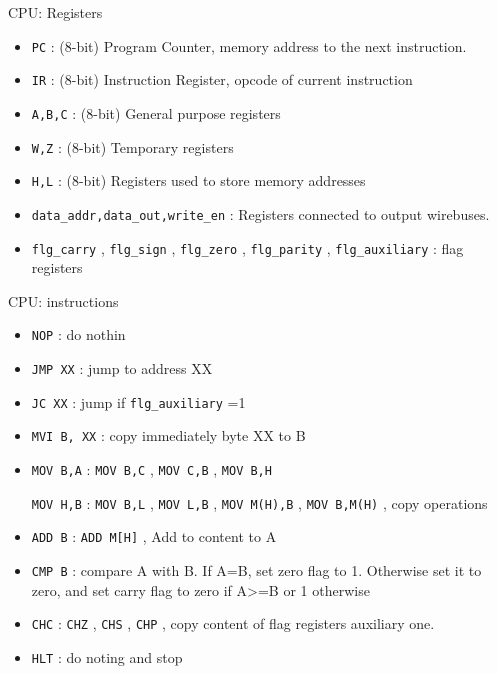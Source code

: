 \documentclass{beamer}
\newcommand{\code}[1]{
	\texttt{#1}
}
\begin{document}
  \begin{frame}{CPU: Registers }
    \begin{itemize}
      \item \code{PC}: (8-bit) Program Counter, memory address to the next instruction.
      \item \code{IR}: (8-bit) Instruction Register, opcode of current instruction 
      \item \code{A,B,C}: (8-bit) General purpose registers 
      \item \code{W,Z}: (8-bit) Temporary registers 
      \item \code{H,L}: (8-bit) Registers used to store memory addresses
      \item \code{data\_addr,data\_out,write\_en}: Registers connected to output wirebuses.
      \item \code{flg\_carry},\code{flg\_sign},\code{flg\_zero},\code{flg\_parity},\code{flg\_auxiliary}: flag registers
  \end{itemize}

  \end{frame}

  \begin{frame}{CPU: instructions}
  \begin{itemize}
    \item \code{NOP}: do nothin 
    \item \code{JMP XX}: jump to address XX
    \item \code{JC XX}: jump if \code{flg\_auxiliary}=1
    \item \code{MVI B, XX}: copy immediately byte XX to B
    \item \code{MOV B,A}: \code{MOV B,C},\code{MOV C,B}, \code{MOV B,H}
    \code{MOV H,B}: \code{MOV B,L}, \code{MOV L,B}, \code{MOV M(H),B}, \code{MOV B,M(H)}, 
     copy operations
    \item \code{ADD B}: \code{ADD M[H]}, Add to content to A
    \item \code{CMP B}: compare A with B. If A=B, set zero flag to 1. Otherwise set it to zero, and set carry flag to zero if A>=B
    or 1 otherwise
    \item \code{CHC}: \code{CHZ}, \code{CHS}, \code{CHP}, copy content of flag registers auxiliary one.
    \item \code{HLT}: do noting and stop
\end{itemize}
\end{frame}
\end{document}

